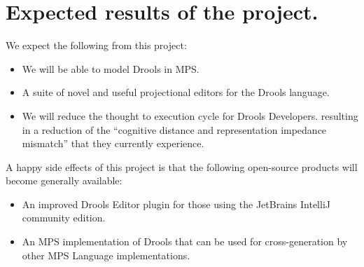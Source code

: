 \section{Expected results of the project.} 

We expect the following from this project:
\begin{itemize}
    \item We will be able to model Drools in MPS.
    \item A suite of novel and useful projectional editors for the Drools language.
    \item We will reduce the thought to execution cycle for Drools Developers. resulting in a reduction of the “cognitive distance and representation
    impedance mismatch”\cite{live_literals} that they currently experience.
\end{itemize}

A happy side effects of this project is that the following open-source products will become generally available:
\begin{itemize}
    \item An improved Drools Editor plugin for those using the JetBrains IntelliJ community edition.
	\item An MPS implementation of Drools that can be used for cross-generation by other MPS Language implementations.
\end{itemize}

